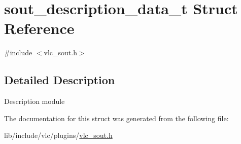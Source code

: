 \hypertarget{structsout__description__data__t}{}\section{sout\+\_\+description\+\_\+data\+\_\+t Struct Reference}
\label{structsout__description__data__t}


{\ttfamily \#include $<$vlc\+\_\+sout.\+h$>$}



\subsection{Detailed Description}
Description module 

The documentation for this struct was generated from the following file\+:\begin{DoxyCompactItemize}
\item 
lib/include/vlc/plugins/\hyperlink{vlc__sout_8h}{vlc\+\_\+sout.\+h}\end{DoxyCompactItemize}
